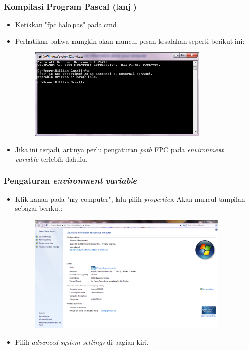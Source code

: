 \documentclass{beamer}
\begin{document}
\begin{frame}
\frametitle{Kompilasi Program Pascal (lanj.)}
\begin{itemize}
	\item Ketikkan "fpc halo.pas" pada cmd.
	\item Perhatikan bahwa mungkin akan muncul pesan kesalahan seperti berikut ini:
	\begin{figure}
		\includegraphics[width=9cm]{asset/cmd_0.PNG}
	\end{figure}
	\item Jika ini terjadi, artinya perlu pengaturan \textit{path} FPC pada \textit{environment variable} terlebih dahulu.
\end{itemize}
\end{frame}

\begin{frame}
\frametitle{Pengaturan \textit{environment variable}}
\begin{itemize}
	\item Klik kanan pada "my computer", lalu pilih \textit{properties}. Akan muncul tampilan sebagai berikut:
	\begin{figure}
		\includegraphics[width=10cm]{asset/path_1.PNG}
	\end{figure}
	\item Pilih \textit{advanced system settings} di bagian kiri.
\end{itemize}
\end{frame}
\end{document}

